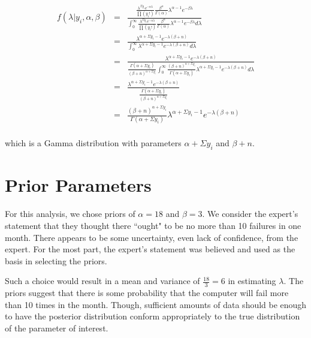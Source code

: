 \documentclass[12pt]{article}
\begin{document}
\begin{eqnarray*}
f(\lambda|y_i,\alpha,\beta) &=& \frac{\frac{\lambda^{\Sigma y_i}e^{-n\lambda}}{\prod (y_i!)}\frac{\beta^\alpha}{\Gamma(\alpha)}\lambda^{\alpha-1}e^{-\beta\lambda}}{\int_0^\infty\frac{\lambda^{\Sigma y_i}e^{-n\lambda}}{\prod (y_i!)}\frac{\beta^\alpha}{\Gamma(\alpha)}\lambda^{\alpha-1}e^{-\beta\lambda}d\lambda} \\
&=& \frac{\lambda^{\alpha+\Sigma y_i-1}e^{-\lambda(\beta+n)}}{\int_0^\infty\lambda^{\alpha+\Sigma y_i-1}e^{-\lambda(\beta+n)}d\lambda} \\
&=& \frac{\lambda^{\alpha+\Sigma y_i-1}e^{-\lambda(\beta+n)}}{\frac{\Gamma(\alpha+\Sigma y_i)}{(\beta+n)^{\alpha+\Sigma y_i}}\int_0^\infty\frac{(\beta+n)^{\alpha+\Sigma y_i}}{\Gamma(\alpha+\Sigma y_i)}\lambda^{\alpha+\Sigma y_i-1}e^{-\lambda(\beta+n)}d\lambda} \\
&=& \frac{\lambda^{\alpha+\Sigma y_i-1}e^{-\lambda(\beta+n)}}{\frac{\Gamma(\alpha+\Sigma y_i)}{(\beta+n)^{\alpha+\Sigma y_i}}} \\
&=& \frac{(\beta+n)^{\alpha+\Sigma y_i}}{\Gamma(\alpha+\Sigma y_i)}\lambda^{\alpha+\Sigma y_i-1}e^{-\lambda(\beta+n)} \\
\end{eqnarray*}

\noindent which is a Gamma distribution with parameters $\alpha+\Sigma y_i$ and $\beta+n$.  %

\section*{Prior Parameters}

\noindent For this analysis, we chose priors of $\alpha=18$ and $\beta=3$.  We consider the expert's statement that they thought there ``ought" to be no more than 10 failures in one month.  There appears to be some uncertainty, even lack of confidence, from the expert.  For the most part, the expert's statement was believed and used as the basis in selecting the priors.
\bigskip

\noindent Such a choice would result in a mean and variance of $\frac{18}{3}=6$ in estimating $\lambda$.  The priors suggest that there is some probability that the computer will fail more than 10 times in the month.  Though, sufficient amounts of data should be enough to have the posterior distribution conform appropriately to the true distribution of the parameter of interest.
\end{document}

